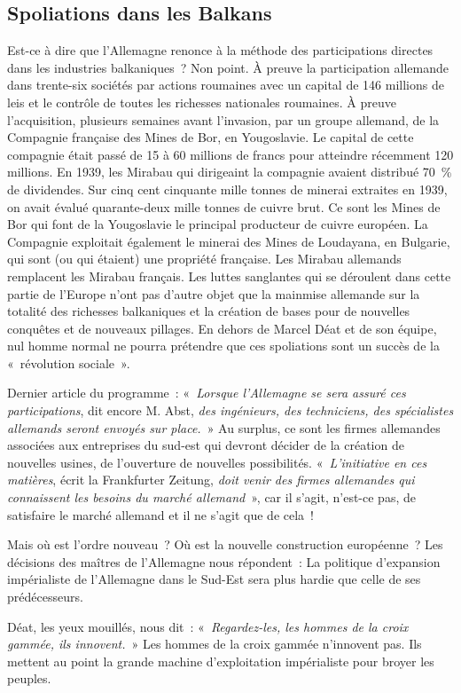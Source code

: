 \documentclass[french,twoside]{book} %
\begin{document}
\subsection[Spoliations dans les Balkans]{Spoliations dans les Balkans}
\noindent Est-ce à dire que l’Allemagne renonce à la méthode des participations directes dans les industries balkaniques ? Non point. À preuve la participation allemande dans trente-six sociétés par actions roumaines avec un capital de 146 millions de leis et le contrôle de toutes les richesses nationales roumaines. À preuve l’acquisition, plusieurs semaines avant l’invasion, par un groupe allemand, de la Compagnie française des Mines de Bor, en Yougoslavie. Le capital de cette compagnie était passé de 15 à 60 millions de francs pour atteindre récemment 120 millions. En 1939, les Mirabau qui dirigeaint la compagnie avaient distribué 70 \% de dividendes. Sur cinq cent cinquante mille tonnes de minerai extraites en 1939, on avait évalué quarante-deux mille tonnes de cuivre brut. Ce sont les Mines de Bor qui font de la Yougoslavie le principal producteur de cuivre européen. La Compagnie exploitait également le minerai des Mines de Loudayana, en Bulgarie, qui sont (ou qui étaient) une propriété française. Les Mirabau allemands remplacent les Mirabau français. Les luttes sanglantes qui se déroulent dans cette partie de l’Europe n’ont pas d’autre objet que la mainmise allemande sur la totalité des richesses balkaniques et la création de bases pour de nouvelles conquêtes et de nouveaux pillages. En dehors de Marcel Déat et de son équipe, nul homme normal ne pourra prétendre que ces spoliations sont un succès de la « révolution sociale ».\par
Dernier article du programme : «\emph{ Lorsque l’Allemagne se sera assuré ces participations}, dit encore M. Abst, \emph{des ingénieurs, des techniciens, des spécialistes allemands seront envoyés sur place.} » Au surplus, ce sont les firmes allemandes associées aux entreprises du sud-est qui devront décider de la création de nouvelles usines, de l’ouverture de nouvelles possibilités. « \emph{L’initiative en ces matières}, écrit la Frankfurter Zeitung, \emph{doit venir des firmes allemandes qui connaissent les besoins du marché allemand} », car il s’agit, n’est-ce pas, de satisfaire le marché allemand et il ne s’agit que de cela !\par
Mais où est l’ordre nouveau ? Où est la nouvelle construction européenne ? Les décisions des maîtres de l’Allemagne nous répondent : La politique d’expansion impérialiste de l’Allemagne dans le Sud-Est sera plus hardie que celle de ses prédécesseurs.\par
Déat, les yeux mouillés, nous dit : « \emph{Regardez-les, les hommes de la croix gammée, ils innovent.} » Les hommes de la croix gammée n’innovent pas. Ils mettent au point la grande machine d’exploitation impérialiste pour broyer les peuples.
\end{document}
